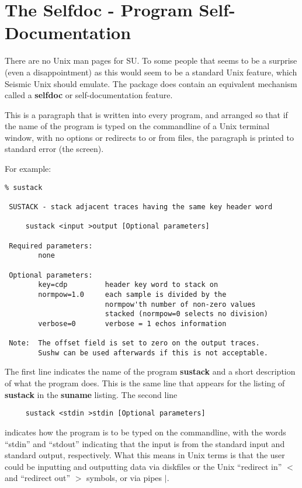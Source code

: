 {{\section{The Selfdoc - Program Self-Documentation}

There are no Unix man pages for SU. To some people that seems
to be a surprise (even a disappointment) as this would seem to be
a standard Unix feature, which Seismic Unix should emulate.
The package does contain an equivalent mechanism called a 
{\bf selfdoc\/} or self-documentation feature.

This is a paragraph that is written into every program, and arranged
so that if the name of the program is typed on the commandline
of a Unix terminal window, with no options or redirects to or 
from files, the paragraph is printed to standard error (the screen).

For example:
{\small\begin{verbatim}
% sustack
                                                                
 SUSTACK - stack adjacent traces having the same key header word
                                                                
     sustack <input >output [Optional parameters]
                                                                
 Required parameters:                                           
        none                                                    
                                                                
 Optional parameters:                                           
        key=cdp         header key word to stack on             
        normpow=1.0     each sample is divided by the           
                        normpow'th number of non-zero values    
                        stacked (normpow=0 selects no division) 
        verbose=0       verbose = 1 echos information           
                                                                
 Note:  The offset field is set to zero on the output traces.   
        Sushw can be used afterwards if this is not acceptable. 
\end{verbatim}}\noindent

The first line indicates the name of the program {\bf sustack\/} and
a short description of what the program does. 
This is the same line that appears for the listing of  {\bf sustack\/}
in the {\bf suname\/} listing.
The second line
\begin{verbatim}
     sustack <stdin >stdin [Optional parameters]
\end{verbatim}\noindent
indicates how the program is to be typed on the commandline, with
the words ``stdin'' and ``stdout'' indicating that the input
is from the standard input and standard output, respectively.
What this means in Unix terms is that the user could be inputting
and outputting data via diskfiles or the Unix ``redirect in'' $<$ 
and ``redirect out'' $>$ symbols, or via pipes $|$.

}}
